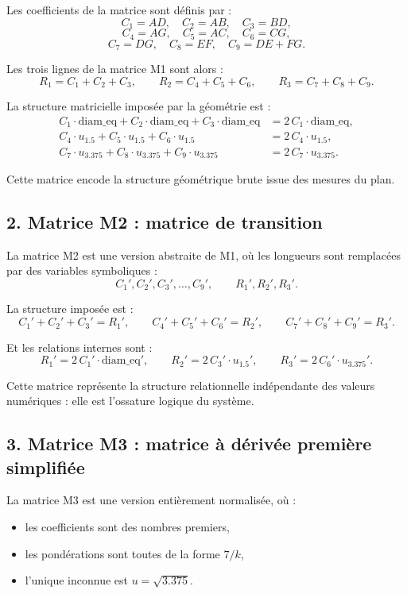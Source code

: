 \documentclass[12pt,a4paper]{article}
\begin{document}
Les coefficients de la matrice sont définis par :
\[
  C_1 = AD,\quad C_2 = AB,\quad C_3 = BD,
\]
\[
  C_4 = AG,\quad C_5 = AC,\quad C_6 = CG,
\]
\[
  C_7 = DG,\quad C_8 = EF,\quad C_9 = DE + FG.
\]

Les trois lignes de la matrice M1 sont alors :
\[
  R_1 = C_1 + C_2 + C_3,\qquad
  R_2 = C_4 + C_5 + C_6,\qquad
  R_3 = C_7 + C_8 + C_9.
\]

La structure matricielle imposée par la géométrie est :
\[
  \begin{aligned}
    C_1 \cdot \mathrm{diam\_eq} + C_2 \cdot \mathrm{diam\_eq} + C_3 \cdot \mathrm{diam\_eq}
      &= 2\, C_1 \cdot \mathrm{diam\_eq}, \\
    C_4 \cdot u_{1.5} + C_5 \cdot u_{1.5} + C_6 \cdot u_{1.5}
      &= 2\, C_4 \cdot u_{1.5}, \\
    C_7 \cdot u_{3.375} + C_8 \cdot u_{3.375} + C_9 \cdot u_{3.375}
      &= 2\, C_7 \cdot u_{3.375}.
  \end{aligned}
\]

Cette matrice encode la structure géométrique brute issue des mesures du plan.

\subsection{2. Matrice M2 : matrice de transition}

La matrice M2 est une version abstraite de M1, où les longueurs sont remplacées
par des variables symboliques :
\[
  C_1', C_2', C_3',\dots,C_9',\qquad R_1', R_2', R_3'.
\]

La structure imposée est :
\[
  C_1' + C_2' + C_3' = R_1',\qquad
  C_4' + C_5' + C_6' = R_2',\qquad
  C_7' + C_8' + C_9' = R_3'.
\]

Et les relations internes sont :
\[
  R_1' = 2\, C_1' \cdot \mathrm{diam\_eq}',\qquad
  R_2' = 2\, C_3' \cdot u_{1.5}',\qquad
  R_3' = 2\, C_6' \cdot u_{3.375}'.
\]

Cette matrice représente la structure relationnelle indépendante des valeurs
numériques : elle est l'ossature logique du système.

\subsection{3. Matrice M3 : matrice à dérivée première simplifiée}

La matrice M3 est une version entièrement normalisée, où :
\begin{itemize}
  \item les coefficients sont des nombres premiers,
  \item les pondérations sont toutes de la forme \(7 / k\),
  \item l'unique inconnue est \(u = \sqrt{3.375}\).
\end{itemize}
\end{document}
